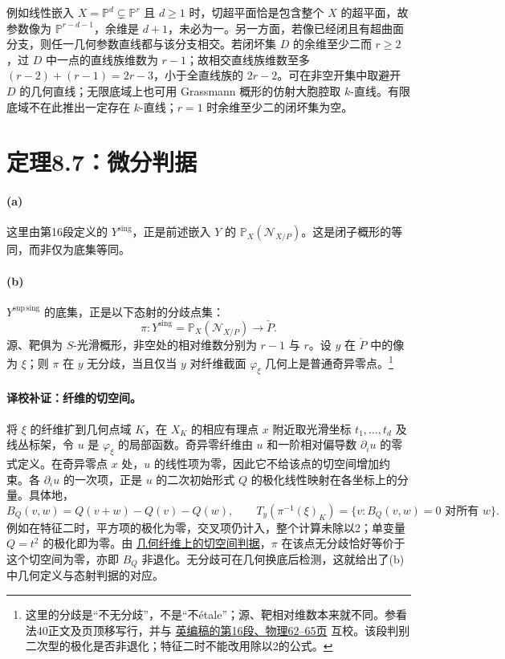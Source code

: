 \documentclass[openany,fontset=fandol]{ctexbook}
\newcommand{\PP}{\mathbb P}
\newcommand{\Ysing}{Y^{\mathrm{sing}}}
\newcommand{\Ysup}{Y^{\mathrm{sup\,sing}}}
\newcommand{\Pdual}{\check P}
\begin{document}
例如线性嵌入 $X=\PP^d\subsetneq \PP^r$ 且 $d\ge1$ 时，切超平面恰是包含整个 $X$ 的超平面，故参数像为 $\PP^{r-d-1}$，余维是 $d+1$，未必为一。另一方面，若像已经闭且有超曲面分支，则任一几何参数直线都与该分支相交。若闭坏集 $D$ 的余维至少二而 $r\ge2$，过 $D$ 中一点的直线族维数为 $r-1$；故相交直线族维数至多 $(r-2)+(r-1)=2r-3$，小于全直线族的 $2r-2$。可在非空开集中取避开 $D$ 的几何直线；无限底域上也可用 Grassmann 概形的仿射大胞腔取 $k$-直线。有限底域不在此推出一定存在 $k$-直线；$r=1$ 时余维至少二的闭坏集为空。

\newpage
\section*{定理8.7：微分判据}
\paragraph{(a)}
这里由第16段定义的 $\Ysing$，正是前述嵌入 $Y$ 的 $\PP_X(\mathcal N_{X/P})$。这是闭子概形的等同，而非仅为底集等同。

\paragraph{(b)}
$\Ysup$ 的底集，正是以下态射的分歧点集：
\[
 \pi:\Ysing=\PP_X(\mathcal N_{X/P})\longrightarrow\Pdual.
\]
源、靶俱为 $S$-光滑概形，非空处的相对维数分别为 $r-1$ 与 $r$。设 $y$ 在 $\Pdual$ 中的像为 $\xi$；则 $\pi$ 在 $y$ 无分歧，当且仅当 $y$ 对纤维截面 $\varphi_\xi$ 几何上是普通奇异零点。\footnote{这里的分歧是“不无分歧”，不是“不\'etale”；源、靶相对维数本来就不同。参看法40正文及页顶移写行，并与 \href{https://webusers.imj-prg.fr/~leila.schneps/grothendieckcircle/EGA/EGA5trans.pdf}{英编稿的第16段、物理62--65页} 互校。该段判别二次型的极化是否非退化；特征二时不能改用除以2的公式。}

\paragraph{译校补证：纤维的切空间。}
将 $\xi$ 的纤维扩到几何点域 $K$，在 $X_K$ 的相应有理点 $x$ 附近取光滑坐标 $t_1,\ldots,t_d$ 及线丛标架，令 $u$ 是 $\varphi_\xi$ 的局部函数。奇异零纤维由 $u$ 和一阶相对偏导数 $\partial_i u$ 的零式定义。在奇异零点 $x$ 处，$u$ 的线性项为零，因此它不给该点的切空间增加约束。各 $\partial_i u$ 的一次项，正是 $u$ 的二次初始形式 $Q$ 的极化线性映射在各坐标上的分量。具体地，
\[
 B_Q(v,w)=Q(v+w)-Q(v)-Q(w),\qquad
 T_{y}(\pi^{-1}(\xi)_K)=\{v:B_Q(v,w)=0\text{ 对所有 }w\}.
\]
例如在特征二时，平方项的极化为零，交叉项仍计入，整个计算未除以2；单变量 $Q=t^2$ 的极化即为零。由 \href{https://stacks.math.columbia.edu/tag/0B2G}{几何纤维上的切空间判据}，$\pi$ 在该点无分歧恰好等价于这个切空间为零，亦即 $B_Q$ 非退化。无分歧可在几何换底后检测，这就给出了(b)中几何定义与态射判据的对应。
\end{document}
